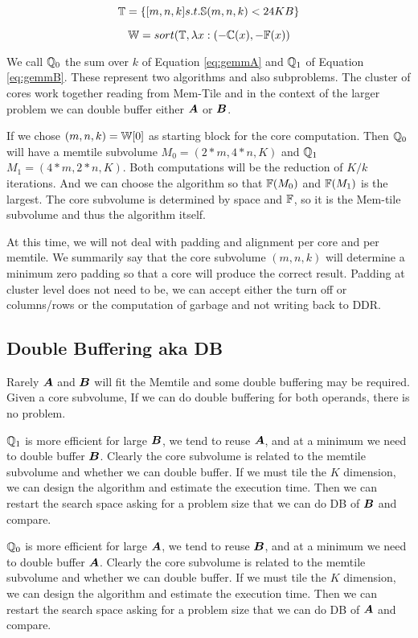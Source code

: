 \documentclass[journal]{IEEEtran}
\begin{document}
\begin{equation}
  \mathbb{T} = \{ [m,n,k]\relax{ s.t. }\mathbb{S}(m,n,k)< 24 KB \}
\end{equation}

\begin{equation}
  \mathbb{W} =  sort(\mathbb{T}, \lambda x: (-\mathbb{C}(x), -\mathbb{F}(x) )
\end{equation}
 

We call $\mathbb{Q}_0$ the sum over $k$ of Equation \ref{eq:gemmA} and
$\mathbb{Q}_1$ of Equation \ref{eq:gemmB}. These represent two algorithms and
also subproblems. The cluster of cores work together reading from
Mem-Tile and in the context of the larger problem we can double buffer
either ${\boldsymbol A}$ or ${\boldsymbol B}$.

If we chose $(m,n,k) = \mathbb{W}[0]$ as starting block for the core
computation. Then $\mathbb{Q}_0$ will have a memtile subvolume
$M_0=(2*m,4*n,K)$ and $\mathbb{Q}_1$ $M_1=(4*m,2*n,K)$. Both computations
will be the reduction of $K/k$ iterations. And we can choose the
algorithm so that $\mathbb{F}(M_0)$ and $\mathbb{F}(M_1)$ is the largest. The core
subvolume is determined by space and $\mathbb{F}$, so it is the Mem-tile
subvolume and thus the algorithm itself.

At this time, we will not deal with padding and alignment per core and
per memtile. We summarily say that the core subvolume $(m,n,k)$ will
determine a minimum zero padding so that a core will produce the
correct result. Padding at cluster level does not need to be, we can
accept either the turn off or columns/rows or the computation of
garbage and not writing back to DDR.

\subsection{Double Buffering aka DB}  

Rarely ${\boldsymbol A}$ and ${\boldsymbol B}$ will fit the Memtile and some double
buffering may be required. Given a core subvolume, If we can do double
buffering for both operands, there is no problem.


$\mathbb{Q}_1$ is more efficient for large ${\boldsymbol B}$, we tend to reuse
${\boldsymbol A}$, and at a minimum we need to double buffer ${\boldsymbol B}$. Clearly
the core subvolume is related to the memtile subvolume and whether we
can double buffer. If we must tile the $K$ dimension, we can design
the algorithm and estimate the execution time. Then we can restart the
search space asking for a problem size that we can do DB of ${\boldsymbol B}$
and compare.

$\mathbb{Q}_0$ is more efficient for large ${\boldsymbol A}$, we tend to reuse
${\boldsymbol B}$, and at a minimum we need to double buffer ${\boldsymbol A}$. Clearly
the core subvolume is related to the memtile subvolume and whether we
can double buffer. If we must tile the $K$ dimension, we can design
the algorithm and estimate the execution time. Then we can restart the
search space asking for a problem size that we can do DB of ${\boldsymbol A}$
and compare.
\end{document}
